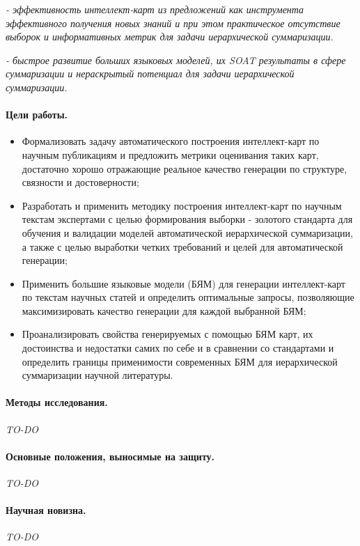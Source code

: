 \documentclass[12pt]{article}
\begin{document}
\textit{- эффективность интеллект-карт из предложений как инструмента эффективного получения новых знаний и при этом практическое отсутствие выборок и информативных метрик для задачи иерархической суммаризации.}

\textit{- быстрое развитие больших языковых моделей, их SOAT результаты в сфере суммаризации и нераскрытый потенциал для задачи иерархической суммаризации.}

\paragraph{Цели работы.}
\begin{itemize}
    \item Формализовать задачу автоматического построения интеллект-карт по научным публикациям и предложить метрики оценивания таких карт, достаточно хорошо отражающие реальное качество генерации по структуре, связности и достоверности;
    \item Разработать и применить методику построения интеллект-карт по научным текстам экспертами с целью формирования выборки - золотого стандарта для обучения и валидации моделей автоматической иерархической суммаризации, а также с целью выработки четких требований и целей для автоматической генерации;
    \item Применить большие языковые модели (БЯМ) для генерации интеллект-карт по текстам научных статей и определить оптимальные запросы, позволяющие максимизировать качество генерации для каждой выбранной БЯМ;
    \item Проанализировать свойства генерируемых с помощью БЯМ карт, их достоинства и недостатки самих по себе и в сравнении со стандартами и определить границы применимости современных БЯМ для иерархической суммаризации научной литературы. 
\end{itemize}


\paragraph{Методы исследования.}
\textit{TO-DO}


\paragraph{Основные положения, выносимые на защиту.}
\textit{TO-DO}


\paragraph{Научная новизна.}
\textit{TO-DO}
\end{document}
